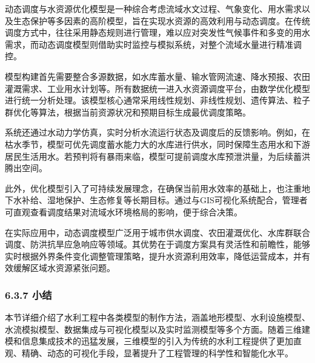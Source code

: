 动态调度与水资源优化模型是一种综合考虑流域水文过程、气象变化、用水需求以及生态保护等多因素的高阶模型，旨在实现水资源的高效利用与动态调度。在传统调度方式中，往往采用静态规则进行管理，难以应对突发性气候事件和多变的用水需求，而动态调度模型则借助实时监控与模拟系统，对整个流域水量进行精准调控。

模型构建首先需要整合多源数据，如水库蓄水量、输水管网流速、降水预报、农田灌溉需求、工业用水计划等。所有数据统一进入水资源调度平台，由数学优化模型进行统一分析处理。该模型核心通常采用线性规划、非线性规划、遗传算法、粒子群优化等算法，根据当前资源状况和预期目标生成最优调度策略。

系统还通过水动力学仿真，实时分析水流运行状态及调度后的反馈影响。例如，在枯水季节，模型可优先调度蓄水能力大的水库进行供水，同时保障生态用水和下游居民生活用水。若预判将有暴雨来临，模型可提前调度水库预泄洪量，为后续蓄洪腾出空间。

此外，优化模型引入了可持续发展理念，在确保当前用水效率的基础上，也注重地下水补给、湿地保护、生态修复等长期目标。通过与GIS可视化系统配合，管理者可直观查看调度结果对流域水环境格局的影响，便于综合决策。

在实际应用中，动态调度模型广泛用于城市供水调度、农田灌溉优化、水库群联合调度、防洪抗旱应急响应等领域。其优势在于调度方案具有灵活性和前瞻性，能够实时根据外界条件变化调整管理策略，提升水资源利用效率，降低运营成本，并有效缓解区域水资源紧张问题。

\hypertarget{ux5c0fux7ed3-2}{%
\subsubsection{6.3.7 小结}\label{ux5c0fux7ed3-2}}

本节详细介绍了水利工程中各类模型的制作方法，涵盖地形模型、水利设施模型、水流模拟模型、数据集成与可视化模型以及实时监测模型等多个方面。随着三维建模和信息集成技术的迅猛发展，三维模型的引入为传统的水利工程提供了更加直观、精确、动态的可视化手段，显著提升了工程管理的科学性和智能化水平。

